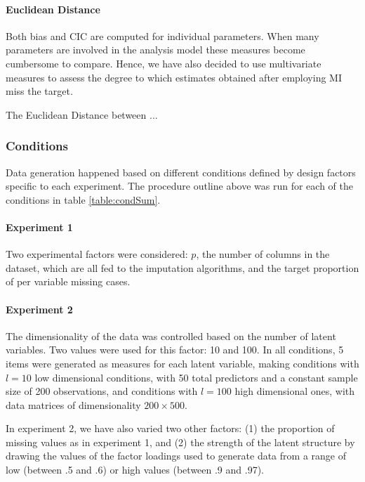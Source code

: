 	\paragraph{Euclidean Distance}
	Both bias and CIC are computed for individual parameters. 
	When many parameters are involved in the analysis model these measures become cumbersome to compare.
	Hence, we have also decided to use multivariate measures to assess the degree to which estimates obtained
	after employing MI miss the target.

	The Euclidean Distance between ...

\subsubsection{Conditions}
	
	Data generation happened based on different conditions defined by design factors specific to each experiment.
	The procedure outline above was run for each of the conditions in table \ref{table:condSum}.

	\paragraph{Experiment 1}
	Two experimental factors were considered: $p$, the number of columns in the dataset, which 
	are all fed to the imputation algorithms, and the target proportion of per variable missing cases. 

	\paragraph{Experiment 2}
	The dimensionality of the data was controlled based on the number of latent variables. 
	Two values were used for this factor: 10 and 100. 
	In all conditions, 5 items were generated as measures for each latent variable, making conditions with $l = 10$ 
	low dimensional conditions, with 50 total predictors and a constant sample size of 200 observations, and 
	conditions with $l = 100$ high dimensional ones, with data matrices of dimensionality $200 \times 500$.

	In experiment 2, we have also varied two other factors: (1) the proportion of missing values as in experiment 1, 
	and (2) the strength of the latent structure by drawing the values of the factor loadings used to generate data
	from a range of low (between .5 and .6) or high values (between .9 and .97).

